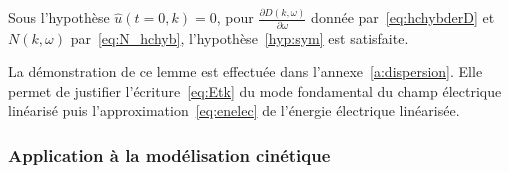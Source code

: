 \begin{lemma}
  Sous l'hypothèse $\hat{u}(t=0,k)=0$, pour $\frac{\partial D(k,\omega)}{\partial\omega}$ donnée par~\eqref{eq:hchybderD} et $N(k,\omega)$ par~\eqref{eq:N_hchyb}, l'hypothèse~\ref{hyp:sym} est satisfaite.
  \label{lemme:hypcashyb}
\end{lemma}

La démonstration de ce lemme est effectuée dans l'annexe~\ref{a:dispersion}. Elle permet de justifier l'écriture~\eqref{eq:Etk} du mode fondamental du champ électrique linéarisé puis l'approximation~\eqref{eq:enelec} de l'énergie électrique linéarisée.

\subsubsection{Application à la modélisation cinétique}

